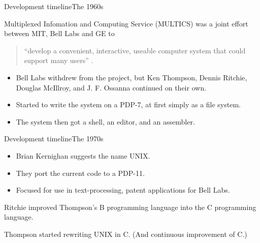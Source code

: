 \documentclass{beamer}
\begin{document}
\begin{frame}{Development timeline}{The 1960s}
	\begin{description}
		\item<1>[1965]
			Multiplexed Infomation and Computing Service (MULTICS) was a joint effort 
			between MIT, Bell Labs and GE to

			\begin{quote}
        ``develop a convenient, interactive, useable computer system that could 
        support many users'' \cite{BellLabs2002tco}.
			\end{quote}

		\item<2>[1969]
			\begin{itemize}
				\item Bell Labs withdrew from the project, but Ken Thompson, Dennis 
					Ritchie, Douglas McIllroy, and J. F. Ossanna continued on their own.

				\item	Started to write the system on a PDP-7, at first simply as a file 
					system.

				\item The system then got a shell, an editor, and an assembler.

			\end{itemize}

	\end{description}
\end{frame}

\begin{frame}{Development timeline}{The 1970s}
	\begin{description}
		\item<1>[1970]
			\begin{itemize}
				\item Brian Kernighan suggests the name UNIX.

				\item They port the current code to a PDP-11.

				\item Focused for use in text-processing, patent applications for 
					Bell Labs.

			\end{itemize}

		\item<2->[1971] Ritchie improved Thompson's B programming language into the 
			C programming language.

		\item<3>[1972] Thompson started rewriting UNIX in C.
			(And continuous improvement of C.)

	\end{description}
\end{frame}
\end{document}
